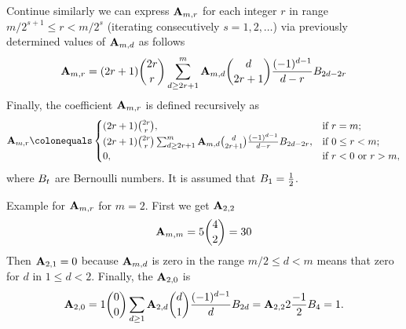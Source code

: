 Continue similarly we can express ${\mathbf{A}} \sb{m,r}$ for each integer $r$ in range $m/2^{s+1}\leq r < m/2^s$
(iterating consecutively $s=1,2,\ldots$) via previously determined values of ${\mathbf{A}} \sb{m,d}$ as follows
\begin{equation}
    {\mathbf{A}} \sb{m,r} =
    (2r+1) \binom{2r}{r} \sum_{d \geq 2r+1}^{m} {\mathbf{A}} \sb{m,d} \binom{d}{2r+1} \frac{(-1)^{d-1}}{d-r}
    {B}\sb{2d-2r}\label{eq:equation12}
\end{equation}
Finally, the coefficient ${\mathbf{A}} \sb{m,r}$ is defined recursively as
\begin{equation}
    \label{eq:def_coeff_a}
    \coeffA{m}{r} \colonequals
    \begin{cases}
    (2r+1)
        \binom{2r}{r}, & \text{if } r=m; \\
        (2r+1) \binom{2r}{r} \sum_{d \geq 2r+1}^{m} \coeffA{m}{d} \binom{d}{2r+1} \frac{(-1)^{d-1}}{d-r}
        \bernoulli{2d-2r}, & \text{if } 0 \leq r<m; \\
        0, & \text{if } r<0 \text{ or } r>m,
    \end{cases}
\end{equation}
where ${B}\sb{t}$ are Bernoulli numbers.
It is assumed that ${B}\sb{1}=\frac{1}{2}$.
\begin{examp}
    Example for ${\mathbf{A}} \sb{m,r}$ for $m=2$.
    First we get ${\mathbf{A}} \sb{2,2}$
    \begin{equation*}
        {\mathbf{A}} \sb{m,m} = 5\binom{4}{2}=30
    \end{equation*}
    Then ${\mathbf{A}} \sb{2,1} = 0$ because ${\mathbf{A}} \sb{m,d}$ is zero in the range $m/2 \leq d < m$ means that zero for $d$ in
    $1 \leq d < 2$.
    Finally, the ${\mathbf{A}} \sb{2,0}$ is
    \begin{equation*}
        {\mathbf{A}} \sb{2,0} = 1 \binom{0}{0} \sum_{d \geq 1} {\mathbf{A}} \sb{2,d} \binom{d}{1} \frac{(-1)^{d-1}}{d} {B}\sb{2d}
        = {\mathbf{A}} \sb{2,2} 2 \frac{-1}{2} {B}\sb{4} = 1.
    \end{equation*}
\end{examp}
